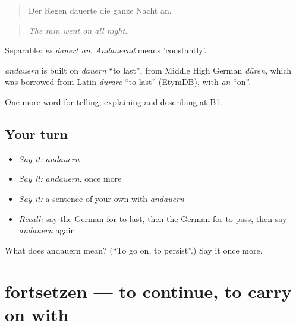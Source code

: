 \begin{quote}
Der Regen dauerte die ganze Nacht an.
\end{quote}

\begin{quote}
\emph{The rain went on all night.}
\end{quote}

Separable: \emph{es dauert an}. \emph{Andauernd} means 'constantly'.

\begin{cousinweb}
\emph{andauern} is built on \emph{dauern} \textquotedblleft{}to last\textquotedblright{}, from Middle High German \emph{dūren}, which was borrowed from Latin \emph{dūrāre} \textquotedblleft{}to last\textquotedblright{} (EtymDB), with \emph{an} \textquotedblleft{}on\textquotedblright{}.
\end{cousinweb}

\begin{grammarlens}[title={What you've built}]
One more word for telling, explaining and describing at B1.
\end{grammarlens}

\subsection*{Your turn}
\begin{itemize}
\raggedright
  \item \emph{Say it:} \emph{andauern}
  \item \emph{Say it:} \emph{andauern}, once more
  \item \emph{Say it:} a sentence of your own with \emph{andauern}
  \item \emph{Recall:} say the German for to last, then the German for to pass, then say \emph{andauern} again
\end{itemize}

\begin{tcolorbox}[breakable,colback=teal!4,colframe=teal!35!black,title={Before you move on}]
What does andauern mean? (\textquotedblleft{}To go on, to persist\textquotedblright{}.) Say it once more.
\end{tcolorbox}
\section[fortsetzen]{fortsetzen — to continue, to carry on with}

\label{lesson:GE-C267-fortsetzen}



